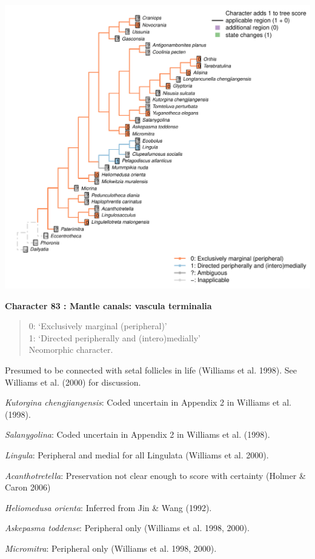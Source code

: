 \documentclass[]{book}
\theoremstyle{definition}
\theoremstyle{definition}
\theoremstyle{definition}
\theoremstyle{remark}
\begin{document}
\includegraphics{Brachiopod_phylogeny_files/figure-latex/unnamed-chunk-5-83.pdf}

\textbf{Character 83 : Mantle canals: vascula terminalia }

\begin{quote}
0: `Exclusively marginal (peripheral)'\\
1: `Directed peripherally and (intero)medially'\\
Neomorphic character.
\end{quote}

Presumed to be connected with setal follicles in life (Williams et al.
1998). See Williams et al. (2000) for discussion.

\emph{Kutorgina chengjiangensis}: Coded uncertain in Appendix 2 in
Williams et al. (1998).

\emph{Salanygolina}: Coded uncertain in Appendix 2 in Williams et al.
(1998).

\emph{Lingula}: Peripheral and medial for all Lingulata (Williams et al.
2000).

\emph{Acanthotretella}: Preservation not clear enough to score with
certainty (Holmer \& Caron 2006)

\emph{Heliomedusa orienta}: Inferred from Jin \& Wang (1992).

\emph{Askepasma toddense}: Peripheral only (Williams et al. 1998, 2000).

\emph{Micromitra}: Peripheral only (Williams et al. 1998, 2000).
\end{document}
